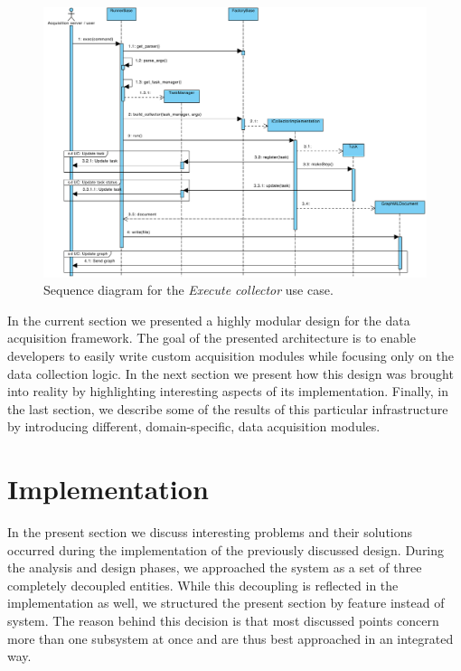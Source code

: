 \begin{figure}
  \begin{adjustwidth}{-11.6mm}{-2cm}
    \includegraphics[width=\linewidth]{images/diagrams/seq-execute-collector}
  \end{adjustwidth}
  \caption{Sequence diagram for the \emph{Execute collector} use case.}
  \label{fig:seq-execute-collector}
\end{figure}

In the current section we presented a highly modular design for the data acquisition framework. The goal of the presented architecture is to enable developers to easily write custom acquisition modules while focusing only on the data collection logic. In the next section we present how this design was brought into reality by highlighting interesting aspects of its implementation. Finally, in the last section, we describe some of the results of this particular infrastructure by introducing different, domain-specific, data acquisition modules.

\section{Implementation}
\label{sec:acquisition/implementation}

In the present section we discuss interesting problems and their solutions occurred during the implementation of the previously discussed design. During the analysis and design phases, we approached the system as a set of three completely decoupled entities. While this decoupling is reflected in the implementation as well, we structured the present section by feature instead of system. The reason behind this decision is that most discussed points concern more than one subsystem at once and are thus best approached in an integrated way.

